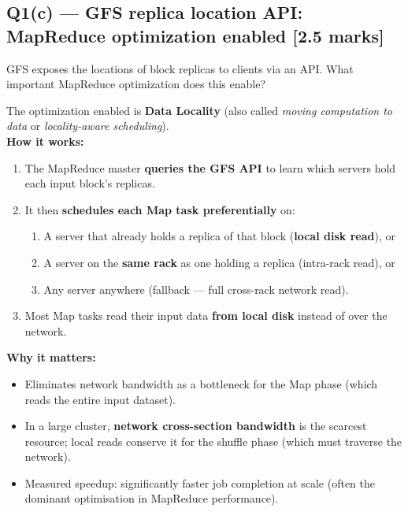 \documentclass[12pt, a4paper]{article}
\newenvironment{qbox}{\begin{mdframed}[style=qframe]}{\end{mdframed}}
\newenvironment{solbox}{\begin{mdframed}[style=solframe]}{\end{mdframed}}
\newcommand{\qmarks}[1]{\hfill\textbf{\color{orange!70!black}[#1 marks]}}
\begin{document}
\subsection{Q1(c) --- GFS replica location API: MapReduce optimization enabled
  \texorpdfstring{\qmarks{2.5}}{}}
\begin{qbox}GFS exposes the locations of block replicas to clients via an API. What important
MapReduce optimization does this enable?\end{qbox}
\begin{solbox}
The optimization enabled is \textbf{Data Locality} (also called
\textit{moving computation to data} or \textit{locality-aware scheduling}).\\[6pt]

\textbf{How it works:}
\begin{enumerate}[leftmargin=1.6cm, itemsep=3pt]
  \item The MapReduce master \textbf{queries the GFS API} to learn which servers hold each
    input block's replicas.
  \item It then \textbf{schedules each Map task preferentially} on:
    \begin{enumerate}[leftmargin=1.2cm, itemsep=1pt]
      \item[1.] A server that already holds a replica of that block (\textbf{local disk read}), or
      \item[2.] A server on the \textbf{same rack} as one holding a replica (intra-rack read), or
      \item[3.] Any server anywhere (fallback --- full cross-rack network read).
    \end{enumerate}
  \item Most Map tasks read their input data \textbf{from local disk} instead of over the network.
\end{enumerate}

\textbf{Why it matters:}
\begin{itemize}[leftmargin=1.4cm, itemsep=1pt]
  \item Eliminates network bandwidth as a bottleneck for the Map phase (which reads the entire
    input dataset).
  \item In a large cluster, \textbf{network cross-section bandwidth} is the scarcest resource;
    local reads conserve it for the shuffle phase (which must traverse the network).
  \item Measured speedup: significantly faster job completion at scale (often the dominant
    optimisation in MapReduce performance).
\end{itemize}
\end{solbox}
\end{document}
